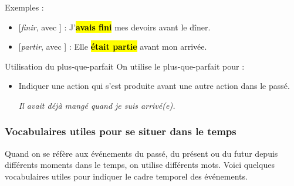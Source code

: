 Exemples :
\begin{itemize}
    \item{} [\textit{finir}, avec ] : J'\hl{\textbf{avais fini}} mes devoirs avant le dîner.
    \item{} [\textit{partir}, avec ] : Elle \hl{\textbf{était partie}} avant mon arrivée.
\end{itemize}

\begin{frbox}[violet]{Utilisation du plus-que-parfait}
    On utilise le plus-que-parfait pour :
    \begin{itemize}
        \item Indiquer une action qui s'est produite avant une autre action dans le passé.
        
        \qquad\textit{Il avait déjà mangé quand je suis arrivé(e).}
    \end{itemize}
\end{frbox}

\subsubsection{Vocabulaires utiles pour se situer dans le temps}

Quand on se réfère aux événements du passé, du présent ou du futur depuis différents
moments dans le temps, on utilise différents mots. Voici quelques vocabulaires utiles
pour indiquer le cadre temporel des événements.

